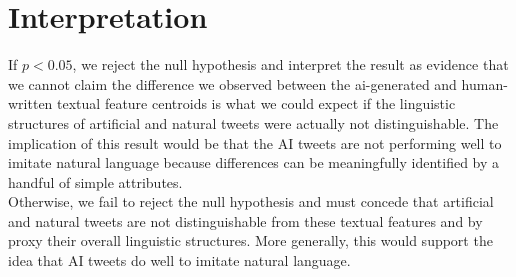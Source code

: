 \section*{Interpretation}

If $ p < 0.05 $, we reject the null hypothesis and interpret the result as evidence that we cannot claim the difference we observed between the ai-generated and human-written textual feature centroids is what we could expect if the linguistic structures of artificial and natural tweets were actually not distinguishable. The implication of this result would be that the AI tweets are not performing well to imitate natural language because differences can be meaningfully identified by a handful of simple attributes.\\

Otherwise, we fail to reject the null hypothesis and must concede that artificial and natural tweets are not distinguishable from these textual features and by proxy their overall linguistic structures. More generally, this would support the idea that AI tweets do well to imitate natural language.
